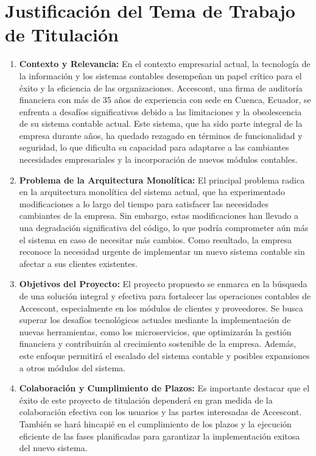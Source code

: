 \documentclass{article}
\begin{document}
 \section*{\textbf{Justificación del Tema de Trabajo de Titulación}}

 \begin{enumerate}
     \item \textbf{Contexto y Relevancia:} En el contexto empresarial actual, la tecnología de la información y los sistemas contables desempeñan un papel crítico para el éxito y la eficiencia de las organizaciones. Accescont, una firma de auditoría financiera con más de 35 años de experiencia con sede en Cuenca, Ecuador, se enfrenta a desafíos significativos debido a las limitaciones y la obsolescencia de su sistema contable actual. Este sistema, que ha sido parte integral de la empresa durante años, ha quedado rezagado en términos de funcionalidad y seguridad, lo que dificulta su capacidad para adaptarse a las cambiantes necesidades empresariales y la incorporación de nuevos módulos contables.
 
     \item \textbf{Problema de la Arquitectura Monolítica:} El principal problema radica en la arquitectura monolítica del sistema actual, que ha experimentado modificaciones a lo largo del tiempo para satisfacer las necesidades cambiantes de la empresa. Sin embargo, estas modificaciones han llevado a una degradación significativa del código, lo que podría comprometer aún más el sistema en caso de necesitar más cambios. Como resultado, la empresa reconoce la necesidad urgente de implementar un nuevo sistema contable sin afectar a sus clientes existentes.
 
     \item \textbf{Objetivos del Proyecto:} El proyecto propuesto se enmarca en la búsqueda de una solución integral y efectiva para fortalecer las operaciones contables de Accescont, especialmente en los módulos de clientes y proveedores. Se busca superar los desafíos tecnológicos actuales mediante la implementación de nuevas herramientas, como los microservicios, que optimizarán la gestión financiera y contribuirán al crecimiento sostenible de la empresa. Además, este enfoque permitirá el escalado del sistema contable y posibles expansiones a otros módulos del sistema.
 
     \item \textbf{Colaboración y Cumplimiento de Plazos:} Es importante destacar que el éxito de este proyecto de titulación dependerá en gran medida de la colaboración efectiva con los usuarios y las partes interesadas de Accescont. También se hará hincapié en el cumplimiento de los plazos y la ejecución eficiente de las fases planificadas para garantizar la implementación exitosa del nuevo sistema.
 
 \end{enumerate}
 
\end{document}
